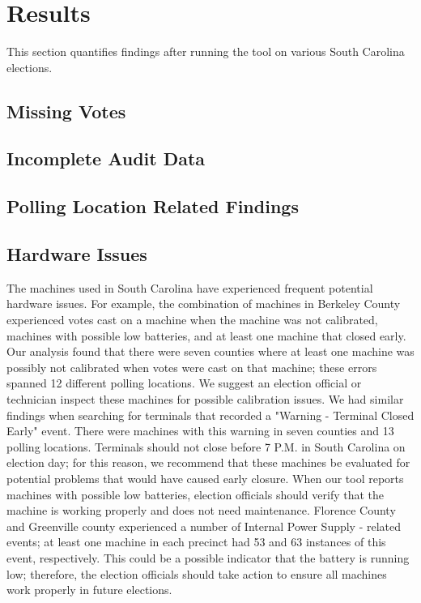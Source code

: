 \section{Results}
This section quantifies findings after running the tool on various South Carolina elections.

\subsection{Missing Votes}

\subsection{Incomplete Audit Data}

\subsection{Polling Location Related Findings}

\subsection{Hardware Issues}
The machines used in South Carolina have experienced frequent potential hardware issues.  For example, the combination of machines in Berkeley County experienced votes cast on a machine when the machine was not calibrated, machines with possible low batteries, and at least one machine that closed early.  Our analysis found that there were seven counties where at least one machine was possibly not calibrated when votes were cast on that machine; these errors spanned 12 different polling locations.  We suggest an election official or technician inspect these machines for possible calibration issues.  We had similar findings when searching for terminals that recorded a "Warning - Terminal Closed Early" event.  There were machines with this warning in seven counties and 13 polling locations.  Terminals should not close before 7 P.M. in South Carolina on election day; for this reason, we recommend that these machines be evaluated for potential problems that would have caused early closure.  When our tool reports machines with possible low batteries, election officials should verify that the machine is working properly and does not need maintenance.  Florence County and Greenville county experienced a number of Internal Power Supply - related events; at least one machine in each precinct had 53 and 63 instances of this event, respectively.  This could be a possible indicator that the battery is running low; therefore, the election officials should take action to ensure all machines work properly in future elections. 

